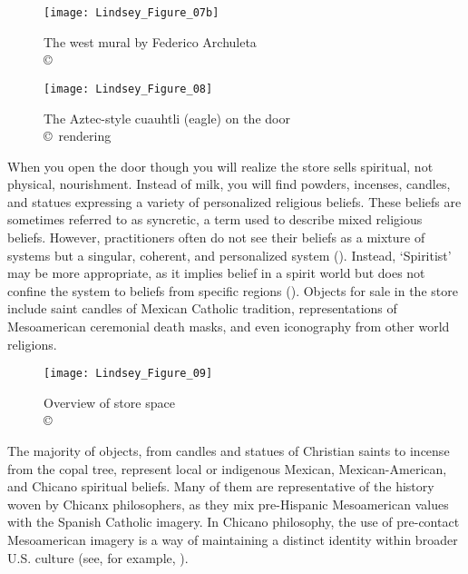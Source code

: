 \begin{figure}[!htb]
	\texttt{[image: Lindsey\_Figure\_07b]}
	\caption{The west mural by Federico Archuleta\\
		{\normalfont\scriptsize \copyright\
			\shortauthor
	}}
	\label{fig:Lindsey_Figure_07b}
\end{figure}

\begin{figure}[!htb]
	\texttt{[image: Lindsey\_Figure\_08]}
	\caption{The Aztec-style cuauhtli (eagle) on the door\\
		{\normalfont\scriptsize \copyright\
			\shortauthor rendering
	}}
	\label{fig:Lindsey_Figure_08}
\end{figure}

When you open the door though you will realize the store sells spiritual, not physical, nourishment. Instead of milk, you will find powders, incenses, candles, and statues expressing a variety of personalized religious beliefs. These beliefs are sometimes referred to as syncretic, a term used to describe mixed religious beliefs. However, practitioners often do not see their beliefs as a mixture of systems but a singular, coherent, and personalized system (\cites{romberg1998}{romberg2005}). Instead, ‘Spiritist’ may be more appropriate, as it implies belief in a spirit world but does not confine the system to beliefs from specific regions (\cite{romberg2005}). Objects for sale in the store include saint candles of Mexican Catholic tradition, representations of Mesoamerican ceremonial death masks, and even iconography from other world religions.

\begin{figure}[!htb]
	\texttt{[image: Lindsey\_Figure\_09]}
	\caption{Overview of store space\\
		{\normalfont\scriptsize \copyright\
			\shortauthor
	}}
	\label{fig:Lindsey_Figure_09}
\end{figure}

The majority of objects, from candles and statues of Christian saints to incense from the copal tree, represent local or indigenous Mexican, Mexican-American, and Chicano spiritual beliefs. Many of them are representative of the history woven by Chicanx philosophers, as they mix pre-Hispanic Mesoamerican values with the Spanish Catholic imagery. In Chicano philosophy, the use of pre-contact Mesoamerican imagery is a way of maintaining a distinct identity within broader U.S. culture (see, for example, \cite{anzaldua}).


